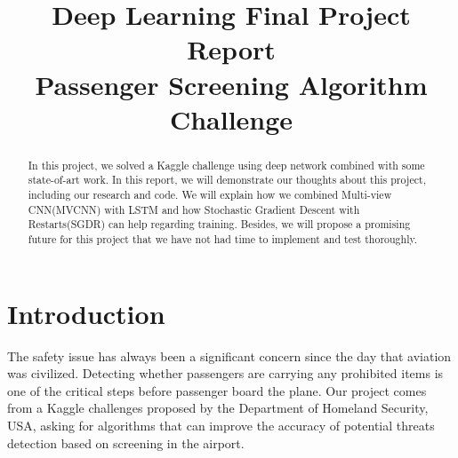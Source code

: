\documentclass[conference,compsoc]{IEEEtran}
\begin{document}
\title{
	Deep Learning Final Project Report \\
	Passenger Screening Algorithm Challenge \\
}


\author{
\and
}

\maketitle

\begin{abstract}
In this project, we solved a Kaggle challenge using deep network combined with some state-of-art work. In this report, we will demonstrate our thoughts about this project, including our research and code. We will explain how we combined Multi-view CNN(MVCNN) with LSTM and how Stochastic Gradient Descent with Restarts(SGDR) can help regarding training. Besides, we will propose a promising future for this project that we have not had time to implement and test thoroughly.
\end{abstract}

\section{Introduction}

The safety issue has always been a significant concern since the day that aviation was civilized. Detecting whether passengers are carrying any prohibited items is one of the critical steps before passenger board the plane. Our project comes from a Kaggle challenges proposed by the Department of Homeland Security, USA, asking for algorithms that can improve the accuracy of potential threats detection based on screening in the airport.
\end{document}
